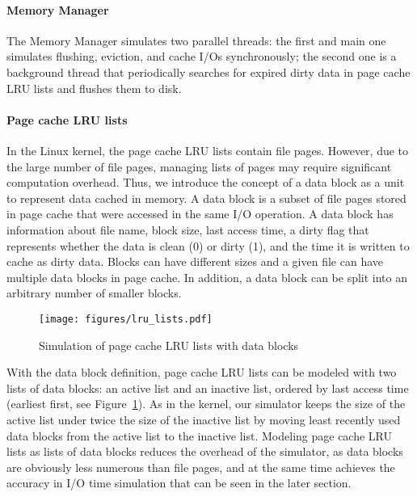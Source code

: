 \documentclass[conference]{IEEEtran}
\begin{document}
			\paragraph*{Memory Manager}
			The Memory Manager simulates  two parallel threads: the first and main one simulates 
			flushing, eviction, and cache I/Os synchronously; the second one is a background thread that  
			periodically searches for expired dirty data in page cache LRU lists 
			and flushes them to disk.

			\paragraph*{Page cache LRU lists}
			In the Linux kernel, the page cache LRU lists contain file pages. However, 
			due to the large number of file pages, managing lists of pages may 
			require significant computation overhead. 
			Thus, we introduce the concept of a data block as a unit to represent data 
			cached in memory. A data block is a subset of file pages stored in
            page cache that were accessed in the same I/O operation. 
			A data block has information about file name, block size, last access 
			time, a dirty flag that represents whether the data is clean (0) 
			or dirty (1), and the time it is written to cache as dirty data. 
			Blocks can have different sizes and a given file can have multiple 
			data blocks in page cache. In addition, a data block can be split into an 
			arbitrary number of smaller blocks.

			\begin{figure}
   				\centering
   				\texttt{[image: figures/lru\_lists.pdf]}
   				\caption{Simulation of page cache LRU lists with data blocks}	\label{fig:lrulist}
			\end{figure}	
			
			With the data block definition, page cache LRU lists can be modeled with 
			two lists of data blocks: an active list and an inactive list, ordered by 
			last access time (earliest first, see Figure~\ref{fig:lrulist}).
			As in the kernel, our simulator keeps the size of the active list under
			twice the size of the inactive list by moving least recently 
            used data blocks from the active list to the inactive list.
			Modeling page cache LRU lists as lists of data blocks reduces the
			overhead of the simulator, as data blocks are obviously less
			numerous than file pages, and at the same time achieves the accuracy in 
			I/O time simulation that can be seen in the later section.
			
\end{document}
